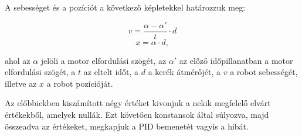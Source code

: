 A sebességet és a pozíciót a következő képletekkel határozzuk meg:

\begin{equation} \label{sebesseg}
	v=\frac{\alpha-\alpha'}{t}\cdot d
\end{equation}
\begin{equation} \label{pozicio}
	x=\alpha\cdot d,
\end{equation}

ahol az $\alpha$ jelöli a motor elfordulási szögét, az $\alpha'$ az előző időpillanatban a motor elfordulási szögét, a $t$ az eltelt időt, a $d$ a kerék átmérőjét, a $v$ a robot sebességét, illetve az $x$ a robot pozícióját.

Az előbbiekben kiszámított négy értéket kivonjuk a nekik megfelelő elvárt értékekből, amelyek nullák. Ezt követően konstansok által súlyozva, majd összeadva az értékeket, megkapjuk a PID bemenetét vagyis a hibát.